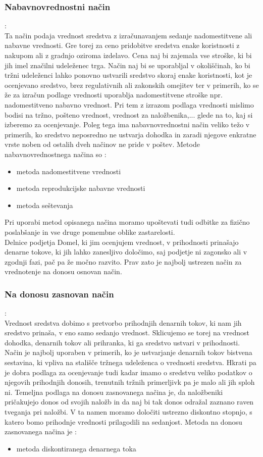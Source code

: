 \documentclass[12pt,a4paper]{amsart}
\theoremstyle{definition} %
\theoremstyle{plain} %
\begin{document}
\subsubsection{Nabavnovrednostni način}:\\
Ta način podaja vrednost sredstva z izračunavanjem sedanje nadomestitvene ali nabavne vrednosti. Gre torej za ceno pridobitve sredstva enake koristnosti z nakupom ali z gradnjo oziroma izdelavo. Cena naj bi zajemala vse stroške, ki bi jih imel značilni udeleženec trga. Način naj bi se uporabljal v okoliščinah, ko bi tržni udeleženci lahko ponovno ustvarili sredstvo skoraj enake koristnosti, kot je ocenjevano sredstvo, brez regulativnih ali zakonskih omejitev ter v primerih, ko se že za izračun podlage vrednosti uporablja nadomestitvene stroške npr. nadomestitveno nabavno vrednost. Pri tem z izrazom podlaga vrednosti mislimo bodisi na tržno, pošteno vrednost, vrednost za naložbenika,... glede na to, kaj si izberemo za ocenjevanje. Poleg tega ima nabavnovrednostni način veliko težo v primerih, ko sredstvo neposredno ne ustvarja dohodka in zaradi njegove enkratne vrste noben od ostalih dveh načinov ne pride v poštev. 
Metode nabavnovrednostnega načina so :
\begin{itemize}
\item metoda nadomestitvene vrednosti
\item metoda reprodukcijske nabavne vrednosti
\item metoda seštevanja
\end{itemize}
Pri uporabi metod opisanega načina moramo upoštevati tudi odbitke za fizično poslabšanje in vse druge pomembne oblike zastarelosti.\\
Delnice podjetja Domel, ki jim ocenjujem vrednost, v prihodnosti prinašajo denarne tokove, ki jih lahko zanesljivo določimo, saj podjetje ni zagonsko ali v zgodnji fazi, pač pa že močno razvito. Prav zato je najbolj ustrezen način za vrednotenje na donosu osnovan način.

\subsubsection{Na donosu zasnovan način}:\\
Vrednost sredstva dobimo s pretvorbo prihodnjih denarnih tokov, ki nam jih sredstvo prinaša, v eno samo sedanjo vrednost. Sklicujemo se torej na vrednost dohodka, denarnih tokov ali prihranka, ki ga sredstvo ustvari v prihodnosti. Način je najbolj uporaben v primerih, ko je ustvarjanje denarnih tokov bistvena sestavina, ki vpliva na stališče tržnega udeleženca o vrednosti sredstva. Hkrati pa je dobra podlaga za ocenjevanje tudi kadar imamo o sredstvu veliko podatkov o njegovih prihodnjih donosih, trenutnih tržnih primerljivk pa je malo ali jih sploh ni. Temeljna podlaga na donosu zasnovanega načina je, da naložbeniki pričakujejo donos od svojih naložb in da naj bi tak donos odražal zaznano raven tveganja pri naložbi. V ta namen moramo določiti ustrezno diskontno stopnjo, s katero bomo prihodnje vrednosti prilagodili na sedanjost.
Metoda na donosu zasnovanega načina je :
\begin{itemize}
\item metoda diskontiranega denarnega toka
\end{itemize}
\end{document}
